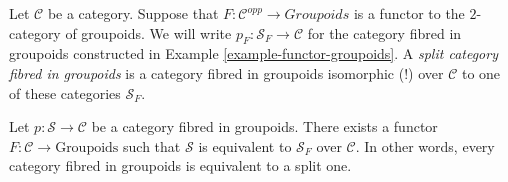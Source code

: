 \begin{definition}
\label{definition-split-category-fibred-in-groupoids}
Let $\mathcal{C}$ be a category.
Suppose that $F : \mathcal{C}^{opp} \to \textit{Groupoids}$ is a functor
to the $2$-category of groupoids.
We will write $p_F : \mathcal{S}_F \to \mathcal{C}$ for the
category fibred in groupoids constructed in
Example \ref{example-functor-groupoids}.
A {\it split category fibred in groupoids} is a
category fibred in groupoids isomorphic (!)
over $\mathcal{C}$ to one of these categories {\it $\mathcal{S}_F$}.
\end{definition}

\begin{lemma}
\label{lemma-fibred-groupoids-strict}
Let $ p : \mathcal{S} \to \mathcal{C}$ be a category fibred in groupoids.
There exists a functor $F : \mathcal{C} \to \text{Groupoids}$ such that
$\mathcal{S}$ is equivalent to $\mathcal{S}_F$ over $\mathcal{C}$. In other
words, every category fibred in groupoids is equivalent to a split one.
\end{lemma}

